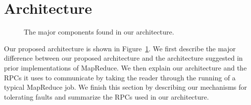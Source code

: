 \documentclass[10pt,letter,final,article,twocolumn]{article} %
\begin{document}
\section{Architecture}
\label{sec:arch}
\begin{figure}[htbp]
\begin{center}
\caption{The major components found in our architecture.}
\label{fig:arch}
\end{center}
\end{figure}


Our proposed architecture is shown in Figure~\ref{fig:arch}. We first describe the major difference between our proposed architecture and the architecture suggested in prior implementations of MapReduce. We then explain our architecture and the RPCs it uses to communicate by taking the reader through the running of a typical MapReduce job. We finish this section by describing our mechanisms for tolerating faults and summarize the RPCs used in our architecture.
\end{document}
